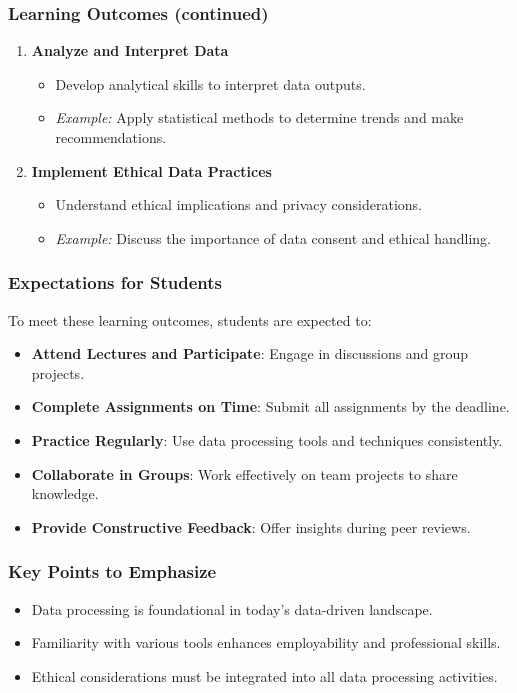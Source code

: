\documentclass[aspectratio=169]{beamer}
\begin{document}
\begin{frame}[fragile]
    \frametitle{Learning Outcomes (continued)}
    \begin{enumerate}[resume]
        \item \textbf{Analyze and Interpret Data}
        \begin{itemize}
            \item Develop analytical skills to interpret data outputs.
            \item \textit{Example:} Apply statistical methods to determine trends and make recommendations.
        \end{itemize}

        \item \textbf{Implement Ethical Data Practices}
        \begin{itemize}
            \item Understand ethical implications and privacy considerations.
            \item \textit{Example:} Discuss the importance of data consent and ethical handling.
        \end{itemize}
    \end{enumerate}
\end{frame}

\begin{frame}[fragile]
    \frametitle{Expectations for Students}
    To meet these learning outcomes, students are expected to:
    \begin{itemize}
        \item \textbf{Attend Lectures and Participate}: Engage in discussions and group projects.
        \item \textbf{Complete Assignments on Time}: Submit all assignments by the deadline.
        \item \textbf{Practice Regularly}: Use data processing tools and techniques consistently.
        \item \textbf{Collaborate in Groups}: Work effectively on team projects to share knowledge.
        \item \textbf{Provide Constructive Feedback}: Offer insights during peer reviews.
    \end{itemize}
\end{frame}

\begin{frame}[fragile]
    \frametitle{Key Points to Emphasize}
    \begin{itemize}
        \item Data processing is foundational in today’s data-driven landscape.
        \item Familiarity with various tools enhances employability and professional skills.
        \item Ethical considerations must be integrated into all data processing activities.
    \end{itemize}
\end{frame}
\end{document}

